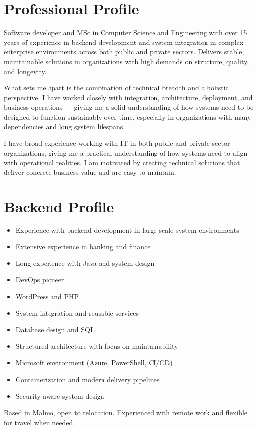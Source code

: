 \section*{Professional Profile}

Software developer and MSc in Computer Science and Engineering with over 15 years of experience in backend development and system integration in complex enterprise environments across both public and private sectors. Delivers stable, maintainable solutions in organizations with high demands on structure, quality, and longevity.

What sets me apart is the combination of technical breadth and a holistic perspective. I have worked closely with integration, architecture, deployment, and business operations — giving me a solid understanding of how systems need to be designed to function sustainably over time, especially in organizations with many dependencies and long system lifespans.

I have broad experience working with IT in both public and private sector organizations, giving me a practical understanding of how systems need to align with operational realities. I am motivated by creating technical solutions that deliver concrete business value and are easy to maintain.

\section*{Backend Profile}

\begin{itemize}[noitemsep]
  \item Experience with backend development in large-scale system environments
  \item Extensive experience in banking and finance
  \item Long experience with Java and system design
  \item DevOps pioneer
  \item WordPress and PHP
  \item System integration and reusable services
  \item Database design and SQL
  \item Structured architecture with focus on maintainability
  \item Microsoft environment (Azure, PowerShell, CI/CD)
  \item Containerization and modern delivery pipelines
  \item Security-aware system design
\end{itemize}

Based in Malmö, open to relocation. Experienced with remote work and flexible for travel when needed.
